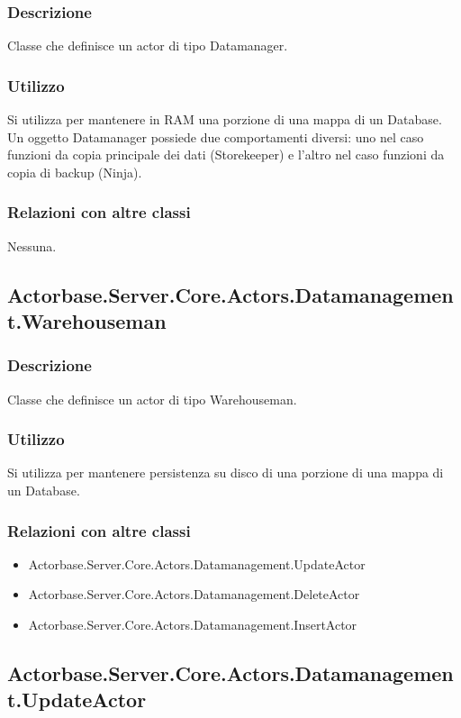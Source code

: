 \documentclass[a4paper]{article}
\begin{document}
			\subsubsection{Descrizione}
				Classe che definisce un actor di tipo Datamanager.
			\subsubsection{Utilizzo}
				Si utilizza per mantenere in RAM una porzione di una mappa di un Database. Un oggetto Datamanager possiede due comportamenti diversi: uno nel caso funzioni da copia principale dei dati (Storekeeper) e l'altro nel caso funzioni da copia di backup (Ninja).
			\subsubsection{Relazioni con altre classi}
				Nessuna.
			
		\subsection{Actorbase.Server.Core.Actors.Datamanagement.Warehouseman}
			\subsubsection{Descrizione}
				Classe che definisce un actor di tipo Warehouseman.
			\subsubsection{Utilizzo}
				Si utilizza per mantenere persistenza su disco di una porzione di una mappa di un Database.
			\subsubsection{Relazioni con altre classi}
			\begin{itemize}
				\item Actorbase.Server.Core.Actors.Datamanagement.UpdateActor
				\item Actorbase.Server.Core.Actors.Datamanagement.DeleteActor
				\item Actorbase.Server.Core.Actors.Datamanagement.InsertActor
			\end{itemize}
			
		\subsection{Actorbase.Server.Core.Actors.Datamanagement.UpdateActor}
\end{document}
